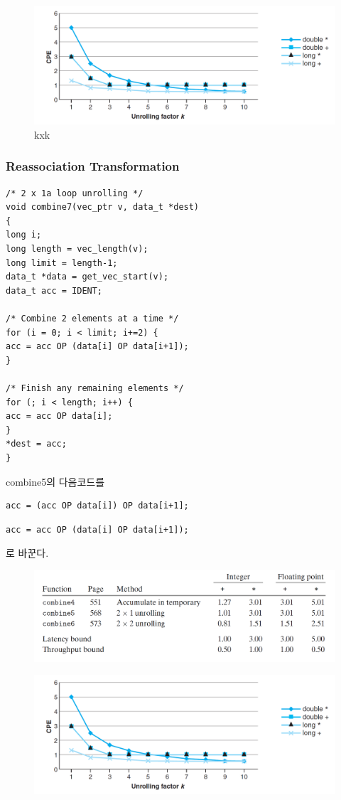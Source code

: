 \begin{figure}[h!]
    \centering
    \includegraphics[scale=0.3]{pic/section5/pic8}
    \caption{kxk}
\end{figure}


\subsubsection{Reassociation Transformation}


\begin{lstlisting}[style = CStyle]
/* 2 x 1a loop unrolling */
void combine7(vec_ptr v, data_t *dest)
{
long i;
long length = vec_length(v);
long limit = length-1;
data_t *data = get_vec_start(v);
data_t acc = IDENT;

/* Combine 2 elements at a time */
for (i = 0; i < limit; i+=2) {
acc = acc OP (data[i] OP data[i+1]);
}

/* Finish any remaining elements */
for (; i < length; i++) {
acc = acc OP data[i];
}
*dest = acc;
}
\end{lstlisting}

combine5의 다음코드를


\begin{lstlisting}[style = CStyle]
    acc = (acc OP data[i]) OP data[i+1];
\end{lstlisting}


\begin{lstlisting}[style = CStyle]
    acc = acc OP (data[i] OP data[i+1]);
\end{lstlisting}
로 바꾼다.

\begin{figure}[h!]
    \centering
    \includegraphics[scale=0.3]{pic/section5/pic7}
    \caption{}
\end{figure}



\begin{figure}[h!]
    \centering
    \includegraphics[scale=0.3]{pic/section5/pic8}
    \caption{}
\end{figure}


